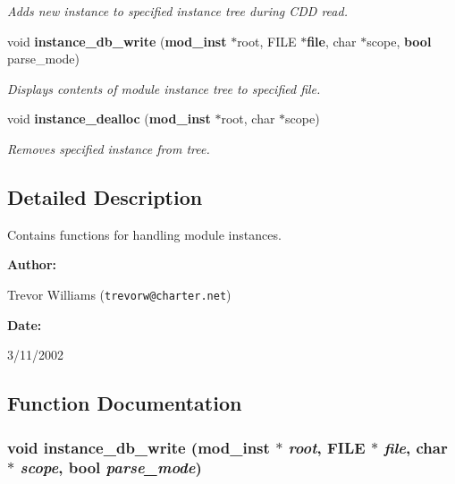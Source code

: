 \begin{CompactItemize}
\begin{CompactList}\small\item\em Adds new instance to specified instance tree during CDD read.\item\end{CompactList}\item 
void {\bf instance\_\-db\_\-write} ({\bf mod\_\-inst} $\ast$root, FILE $\ast${\bf file}, char $\ast$scope, {\bf bool} parse\_\-mode)
\begin{CompactList}\small\item\em Displays contents of module instance tree to specified file.\item\end{CompactList}\item 
void {\bf instance\_\-dealloc} ({\bf mod\_\-inst} $\ast$root, char $\ast$scope)
\begin{CompactList}\small\item\em Removes specified instance from tree.\item\end{CompactList}\end{CompactItemize}


\subsection{Detailed Description}
Contains functions for handling module instances.



\begin{Desc}
\item[{\bf Author: }]\par
Trevor Williams ({\tt trevorw@charter.net}) \end{Desc}
\begin{Desc}
\item[{\bf Date: }]\par
3/11/2002

\end{Desc}


\subsection{Function Documentation}
\subsubsection{\setlength{\rightskip}{0pt plus 5cm}void instance\_\-db\_\-write ({\bf mod\_\-inst} $\ast$ {\em root}, FILE $\ast$ {\em file}, char $\ast$ {\em scope}, {\bf bool} {\em parse\_\-mode})}\label{instance_8h_a5}


